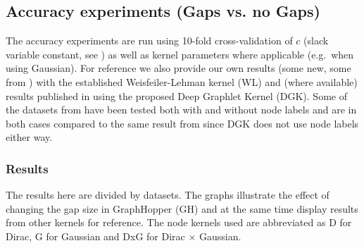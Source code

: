 \documentclass{article}
\begin{document}
\subsection{Accuracy experiments (Gaps vs. no Gaps)}
The accuracy experiments are run using 10-fold cross-validation of $c$ (slack variable constant, see \cite{svm-graph-kernels}) as well as kernel parameters where applicable (e.g.\ when using Gaussian). For reference we also provide our own results (some new, some from \cite{svm-graph-kernels}) with the established Weisfeiler-Lehman kernel\cite{WL} (WL) and (where available) results published in \cite{yanardag} using the proposed Deep Graphlet Kernel (DGK). Some of the datasets from \cite{yanardag} have been tested both with and without node labels and are in both cases compared to the same result from \cite{yanardag} since DGK does not use node labels either way.

\subsubsection{Results}
The results here are divided by datasets. The graphs illustrate the effect of changing the gap size in GraphHopper (GH) and at the same time display results from other kernels for reference. The node kernels used are abbreviated as D for Dirac, G for Gaussian and DxG for Dirac $\times$ Gaussian.
\end{document}
